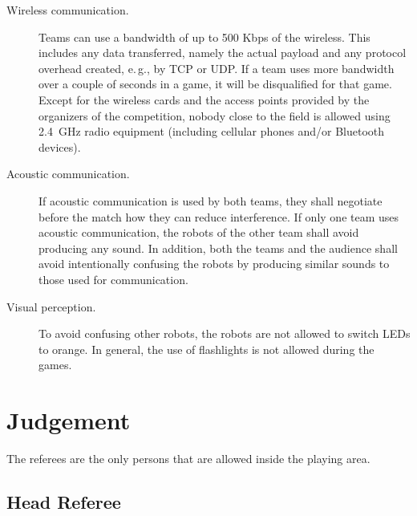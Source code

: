 \documentclass[12pt]{article}
\newcommand{\eg}{\mbox{e.\,g.}\xspace}
\begin{document}
\begin{description}

\item[Wireless communication.] Teams can use a bandwidth of up to 500 Kbps of the wireless. This includes any data transferred, namely the actual payload and any protocol overhead created, \eg, by TCP or UDP. If a team uses more bandwidth over a couple of seconds in a game, it will be disqualified for that game. Except for the wireless cards and the access points provided by the organizers of the competition, nobody close to the field is allowed using 2.4~GHz radio equipment (including cellular phones and/or Bluetooth devices).

\item[Acoustic communication.] If acoustic communication is used by both teams, they shall negotiate before the match how they can reduce interference. If only one team uses acoustic communication, the robots of the other team shall avoid producing any sound. In addition, both the teams and the audience shall avoid intentionally confusing the robots by producing similar sounds to those used for communication.

\item[Visual perception.] To avoid confusing other robots, the robots are not allowed to switch LEDs to orange. In general, the use of flashlights is not allowed during the games.

\end{description}

\section{Judgement}

The referees are the only persons that are allowed inside the playing area. 

\subsection{Head Referee}
\end{document}
